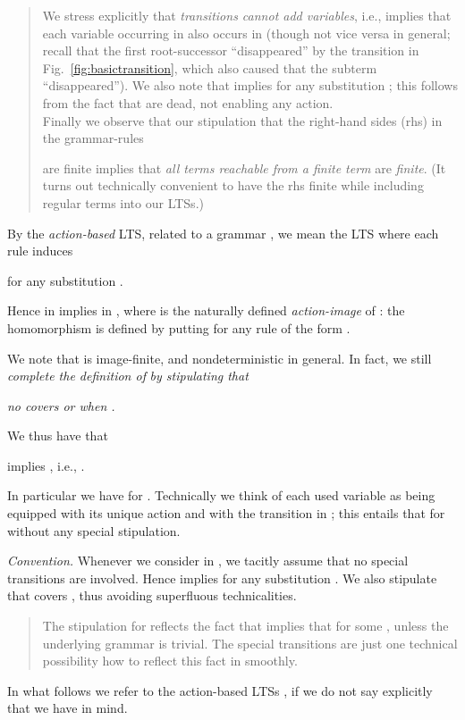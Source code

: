 \documentclass{llncs}
\begin{document}
\begin{quote}
{\small
We stress explicitly that \emph{transitions cannot add variables},
i.e.,  implies that
each variable occurring in  also occurs in  (though not vice
versa in general; recall that the first root-successor 
``disappeared'' by the transition in Fig.~\ref{fig:basictransition},
which also caused that the subterm  ``disappeared'').
We also note that   implies  for any
substitution ; this follows from the fact that  are dead,
 not enabling any action.
\\
Finally we observe that our stipulation that the 
right-hand sides (rhs)  in the grammar-rules

are finite implies
that
\emph{all terms reachable from a finite term} are \emph{finite}.
(It turns out technically convenient to have the rhs finite 
while including regular terms into our LTSs.)
}
\end{quote}
By the \emph{action-based} LTS, related to a grammar
,  
we mean the LTS  
where each rule 
induces  
\begin{center}
 
\end{center}
for any 
substitution 
.

Hence  in  implies 
  in , where
  is the naturally defined \emph{action-image} of :
the homomorphism  is defined by putting
 for any rule  of the form .

We note that  is image-finite,  
and nondeterministic in general.
In fact, we still \emph{complete the definition of} 
 \emph{by stipulating that}
\begin{center}
\emph{no  covers  or  
when
.}
\end{center}
We thus have that
\begin{center}
 implies , i.e., 
.
\end{center}
In particular we have
 for .
Technically we think of each used variable  
as being equipped with its unique action  and with the
transition  in ;
this entails that 
for 
without any special stipulation. 

\smallskip

\emph{Convention.}
Whenever we consider  in 
, we tacitly assume that no 
special transitions  are involved.
Hence  implies  for any substitution
. We also stipulate that 
covers , thus avoiding superfluous technicalities.


\begin{quote}
{\small
The stipulation  for 
reflects the fact that  implies that
 for
some , unless the underlying grammar 
is trivial.
The special transitions  are just one technical possibility 
how to reflect this fact in  smoothly.
}
\end{quote}
In what follows we refer to the action-based LTSs
, 
if we do not say explicitly that we have  in
mind. 
\end{document}
